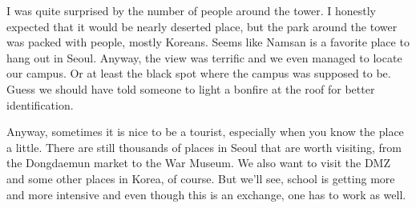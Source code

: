 \begin{post}
\begin{content}

I was quite surprised by the number of people around the tower. I honestly expected that it would be nearly deserted place, but the park around the tower was packed with people, mostly Koreans. Seems like Namsan is a favorite place to hang out in Seoul. Anyway, the view was terrific and we even managed to locate our campus. Or at least the black spot where the campus was supposed to be. Guess we should have told someone to light a bonfire at the roof for better identification.

Anyway, sometimes it is nice to be a tourist, especially when you know the place a little. There are still thousands of places in Seoul that are worth visiting, from the Dongdaemun market to the War Museum. We also want to visit the DMZ and some other places in Korea, of course. But we'll see, school is getting more and more intensive and even though this is an exchange, one has to work as well.

	\end{content}
\end{post}
